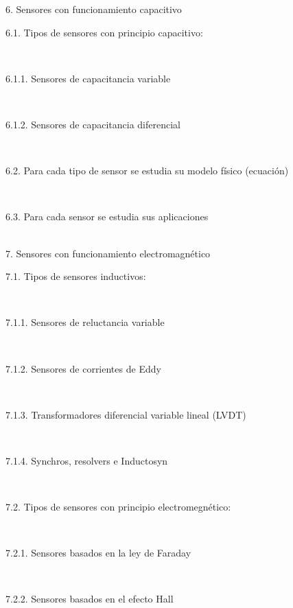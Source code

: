 \documentclass[letterpaper]{article}%
\begin{document}
\begin{tcolorbox}
6. Sensores con funcionamiento capacitivo\\
\hspace*{0.02\linewidth}\parbox{0.98\linewidth}{\strut 6.1. Tipos de sensores con principio capacitivo:\strut}\\
\hspace*{0.04\linewidth}\parbox{0.96\linewidth}{\strut 6.1.1. Sensores de capacitancia variable\strut}\\
\hspace*{0.04\linewidth}\parbox{0.96\linewidth}{\strut 6.1.2. Sensores de capacitancia diferencial\strut}\\
\hspace*{0.02\linewidth}\parbox{0.98\linewidth}{\strut 6.2. Para cada tipo de sensor se estudia su modelo físico (ecuación)\strut}\\
\hspace*{0.02\linewidth}\parbox{0.98\linewidth}{\strut 6.3. Para cada sensor se estudia sus aplicaciones\strut}\\
7. Sensores con funcionamiento electromagnético\\
\hspace*{0.02\linewidth}\parbox{0.98\linewidth}{\strut 7.1. Tipos de sensores inductivos:\strut}\\
\hspace*{0.04\linewidth}\parbox{0.96\linewidth}{\strut 7.1.1. Sensores de reluctancia variable\strut}\\
\hspace*{0.04\linewidth}\parbox{0.96\linewidth}{\strut 7.1.2. Sensores de corrientes de Eddy\strut}\\
\hspace*{0.04\linewidth}\parbox{0.96\linewidth}{\strut 7.1.3. Transformadores diferencial variable lineal (LVDT)\strut}\\
\hspace*{0.04\linewidth}\parbox{0.96\linewidth}{\strut 7.1.4. Synchros, resolvers e Inductosyn\strut}\\
\hspace*{0.02\linewidth}\parbox{0.98\linewidth}{\strut 7.2. Tipos de sensores con principio electromegnético:\strut}\\
\hspace*{0.04\linewidth}\parbox{0.96\linewidth}{\strut 7.2.1. Sensores basados en la ley de Faraday\strut}\\
\hspace*{0.04\linewidth}\parbox{0.96\linewidth}{\strut 7.2.2. Sensores basados en el efecto Hall\strut}\\

\end{tcolorbox}
\end{document}
